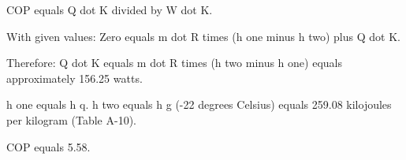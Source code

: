COP equals Q dot K divided by W dot K.  

With given values:  
Zero equals m dot R times (h one minus h two) plus Q dot K.  

Therefore:  
Q dot K equals m dot R times (h two minus h one) equals approximately 156.25 watts.  

h one equals h q.  
h two equals h g (-22 degrees Celsius) equals 259.08 kilojoules per kilogram (Table A-10).  

COP equals 5.58.